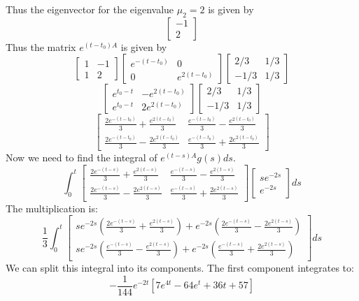 \documentclass{article}
\begin{document}
Thus the eigenvector for the eigenvalue $\mu_2 = 2$ is given by
$$\begin{bmatrix}
    -1\\
    2
\end{bmatrix} $$
Thus the matrix $e^{(t-t_0)A}$ is given by
$$ \begin{bmatrix}
    1 & -1\\
    1 & 2
\end{bmatrix} \begin{bmatrix}
    e^{-(t-t_0)} & 0\\
    0 & e^{2(t-t_0)}
\end{bmatrix} \begin{bmatrix}
    2/3 & 1/3\\
    -1/3 & 1/3
\end{bmatrix}$$
$$\begin{bmatrix}
    e^{t_0-t} & -e^{2(t-t_0)}\\
    e^{t_0-t} & 2e^{2(t-t_0)}
\end{bmatrix} \begin{bmatrix}
    2/3 & 1/3\\
    -1/3 & 1/3
\end{bmatrix} $$
$$\begin{bmatrix}
    \frac{2e^{-(t-t_0)}}{3} + \frac{e^{2(t-t_0)}}{3} & \frac{e^{-(t-t_0)}}{3} - \frac{e^{2(t-t_0)}}{3}\\
    \frac{2e^{-(t-t_0)}}{3} - \frac{2e^{2(t-t_0)}}{3} & \frac{e^{-(t-t_0)}}{3} + \frac{2e^{2(t-t_0)}}{3}
\end{bmatrix}
$$
Now we need to find the integral of $e^{(t-s)A}g(s)ds$. 
$$\int_{0}^{t}\begin{bmatrix}
    \frac{2e^{-(t-s)}}{3} + \frac{e^{2(t-s)}}{3} & \frac{e^{-(t-s)}}{3} - \frac{e^{2(t-s)}}{3}\\
    \frac{2e^{-(t-s)}}{3} - \frac{2e^{2(t-s)}}{3} & \frac{e^{-(t-s)}}{3} + \frac{2e^{2(t-s)}}{3}
\end{bmatrix} \begin{bmatrix}
    se^{-2s}  \\
    e^{-2s}
\end{bmatrix}ds $$
The multiplication is:
$$\frac{1}{3}\int_{0}^{t}\begin{bmatrix}
    se^{-2s}(\frac{2e^{-(t-s)}}{3} + \frac{e^{2(t-s)}}{3}) + e^{-2s}(\frac{2e^{-(t-s)}}{3} - \frac{2e^{2(t-s)}}{3}) \\
    se^{-2s}(\frac{e^{-(t-s)}}{3} - \frac{e^{2(t-s)}}{3}) + e^{-2s}(\frac{e^{-(t-s)}}{3} + \frac{2e^{2(t-s)}}{3})
\end{bmatrix} ds$$
We can split this integral into its components. The first component integrates to:
$$ -\frac{1}{144}  e^{-2t}[7e^{4t}-64e^{t}+36t+57]$$
\end{document}
